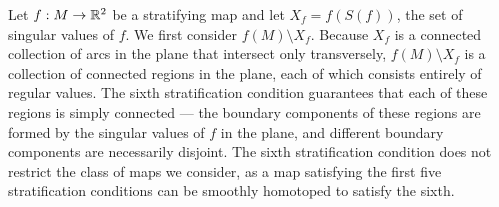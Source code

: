 
Let $f:M\to\mathbb{R}^2$ be a stratifying map and let $X_f = f(S(f))$, the set of singular values of $f$.
We first consider $f(M)\setminus X_f$.
Because $X_f$ is a connected collection of arcs in the plane that intersect only transversely, $f(M)\setminus X_f$ is a collection of connected regions in the plane, each of which consists entirely of regular values.
The sixth stratification condition guarantees that each of these regions is simply connected --- the boundary components of these regions are formed by the singular values of $f$ in the plane, and different boundary components are necessarily disjoint.
The sixth stratification condition does not restrict the class of maps we consider, as a map satisfying the first five stratification conditions can be smoothly homotoped to satisfy the sixth.


